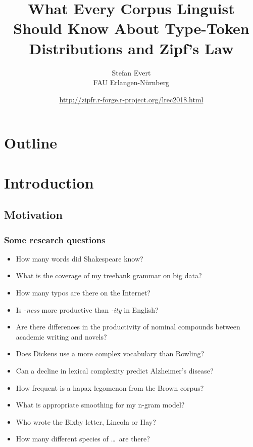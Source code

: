 \documentclass[t]{beamer} %
\title[T1: Zipf's Law]{What Every Corpus Linguist
  Should Know About Type-Token Distributions and Zipf's Law}
\subtitle{\primary{Tutorial Workshop \#9, 22 July 2019}}
\author[Stefan Evert]{Stefan Evert\\ FAU Erlangen-Nürnberg}
\date[22 July 2019 | CC-by-sa]{\href{http://zipfr.r-forge.r-project.org/lrec2018.html}{http://zipfr.r-forge.r-project.org/lrec2018.html}\\
 \light{\small Licensed under CC-by-sa version 3.0}}
\begin{document}

\frame{\titlepage}
\hideLogo{}


\section*{Outline}

\section{Introduction}

\subsection{Motivation}

\begin{frame}
  \frametitle{Some research questions}

  \begin{itemize}
  \item How many words did Shakespeare know?
  \item What is the coverage of my treebank grammar on big data?
  \item How many typos are there on the Internet?
  \item Is \emph{-ness} more productive than \emph{-ity} in English?
  \item Are there differences in the productivity of nominal compounds between academic writing and novels?
  \item Does Dickens use a more complex vocabulary than Rowling?
  \item Can a decline in lexical complexity predict Alzheimer's disease?
  \item How frequent is a hapax legomenon from the Brown corpus?
  \item What is appropriate smoothing for my n-gram model?
  \item Who wrote the Bixby letter, Lincoln or Hay?
  \item How many different species of \ldots\ are there? \citep{Brainerd:82}
  \end{itemize}
\end{frame}
\end{document}
